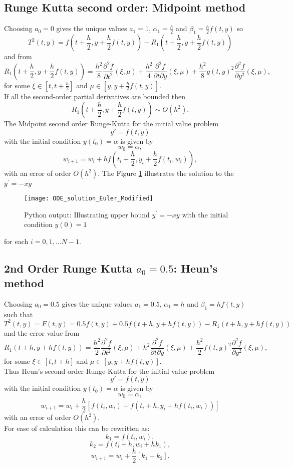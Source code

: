 \subsection{Runge Kutta second order: Midpoint method}
Choosing $a_0=0$ gives the unique values $a_1=1$, $\alpha_1=\frac{h}{2}$ and $\beta_1=\frac{h}{2}f(t,y)$
so
\[T^{2}(t,y) = f(t+\frac{h}{2},y+\frac{h}{2}f(t,y))-R_1(t+\frac{h}{2},y+\frac{h}{2}f(t,y))
\]
and from
\[ R_1(t+\frac{h}{2},y+\frac{h}{2}f(t,y))=\frac{h^2}{8}\frac{\partial^2 f}{\partial t ^2}(\xi,\mu)
+\frac{h^2}{4} \frac{\partial^2 f}{\partial t \partial y}(\xi,\mu)
+\frac{h^2}{8}g(t,y)^2\frac{\partial^2 f}{\partial y^2} (\xi,\mu),
\]for some $\xi \in [t,t+\frac{h}{2}]$ and $\mu \in [y,y+\frac{h}{2}f(t,y)]$.\\
If all the second-order partial derivatives are bounded then
\[ R_1(t+\frac{h}{2},y+\frac{h}{2}f(t,y)) \sim O(h^2). \]
The Midpoint second order Runge-Kutta for the initial value problem
\[y'=f(t,y)\] 
with the initial condition $y(t_0)=\alpha$ is given by
\[w_0=\alpha, \]
\[w_{i+1}=w_i+hf(t_i+\frac{h}{2},y_i+\frac{h}{2}f(t_i,w_i)), \]
with an error of order $O(h^2)$.
The Figure \ref{Modified Euler Figure} illustrates the solution to the  $y^{'}=-xy$
\begin{figure}[H]
\centering
\texttt{[image: ODE\_solution\_Euler\_Modified]}
\caption{Python output: Illustrating upper bound $y^{'}=-xy$ with the initial condition $y(0)=1$ }
\label{Modified Euler Figure}
\end{figure}
for each $i=0,1,...N-1.$

\subsection{2nd Order Runge Kutta $a_0=0.5$: Heun's method}
Choosing $a_0=0.5$ gives the unique values $a_1=0.5$, $\alpha_1=h$ and $\beta_1=hf(t,y)$
such that 
\[T^{2}(t,y)=F(t,y) = 0.5 f(t,y)+0.5 f(t+h,y+hf(t,y))-R_1(t+h,y+hf(t,y))
\]
and the error value from
\[ R_1(t+h,y+hf(t,y))=\frac{h^2}{2}\frac{\partial^2 f}{\partial t ^2}(\xi,\mu)
+h^2 \frac{\partial^2 f}{\partial t \partial y}(\xi,\mu)
+\frac{h^2}{2}f(t,y)^2\frac{\partial^2 f}{\partial y^2} (\xi,\mu),
\]for some $\xi \in [t,t+h]$ and $\mu \in [y,y+hf(t,y)]$.\\

Thus Heun's second order Runge-Kutta for the initial value problem
\[y'=f(t,y)\] 
with the initial condition $y(t_0)=\alpha$ is given by
\[w_0=\alpha, \]
\[w_{i+1}=w_i+\frac{h}{2}[f(t_i,w_i)+f(t_i+h,y_i+hf(t_i,w_i))] \]
with an error of order $O(h^2)$.\\
For ease of calculation this can be rewritten as:
\[k_1=f(t_i,w_i),\]
\[k_2=f(t_i+h,w_i+hk_1),\]
\[w_{i+1}=w_i+\frac{h}{2}[k_1+k_2]. \]

